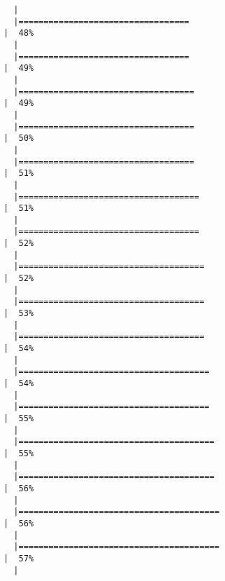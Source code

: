 \documentclass[12pt]{article}
\begin{document}
\begin{verbatim}
  |                                                                            
  |==================================                                    |  48%
  |                                                                            
  |==================================                                    |  49%
  |                                                                            
  |===================================                                   |  49%
  |                                                                            
  |===================================                                   |  50%
  |                                                                            
  |===================================                                   |  51%
  |                                                                            
  |====================================                                  |  51%
  |                                                                            
  |====================================                                  |  52%
  |                                                                            
  |=====================================                                 |  52%
  |                                                                            
  |=====================================                                 |  53%
  |                                                                            
  |=====================================                                 |  54%
  |                                                                            
  |======================================                                |  54%
  |                                                                            
  |======================================                                |  55%
  |                                                                            
  |=======================================                               |  55%
  |                                                                            
  |=======================================                               |  56%
  |                                                                            
  |========================================                              |  56%
  |                                                                            
  |========================================                              |  57%
  |                                                                            

\end{verbatim}
\end{document}

